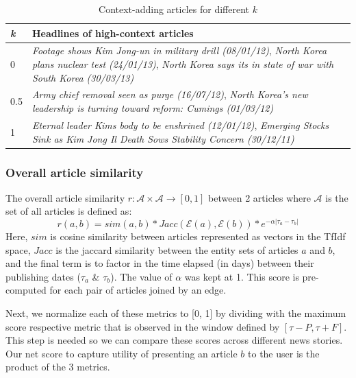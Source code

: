 \begin{table}
\small
\begin{tabular}{|l|p{7cm}|}
\hline
{\bf {\em k}} & {\bf Headlines of high-context articles}\\
\hline
0 & {\em Footage shows Kim Jong-un in military drill (08/01/12)}, {\em North Korea plans nuclear test (24/01/13)}, {\em North Korea says its in state of war with South Korea (30/03/13)}\\
\hline
0.5 & {\em Army chief removal seen as purge (16/07/12)}, {\em North Korea's new leadership is turning toward reform: Cumings (01/03/12)}\\
\hline
1 & {\em Eternal leader Kims body to be enshrined (12/01/12)}, {\em Emerging Stocks Sink as Kim Jong Il Death Sows Stability Concern (30/12/11)}\\
\hline
\end{tabular}
\caption{Context-adding articles for different $k$}
\label{tab:different-contexts}
\end{table}


\subsubsection*{Overall article similarity}
\label{subsec:article_similarity}
The overall article similarity $r:\mathcal{A} \times \mathcal{A} \rightarrow [0,1]$ between 2 articles where $\mathcal{A}$ is the set of all articles is defined as:
\begin{equation}
r(a, b) = sim(a,b) * Jacc(\mathcal{E}(a), \mathcal{E}(b)) * e^{-\alpha|\tau_a - \tau_b|}
\end{equation}
Here, $sim$ is cosine similarity between articles represented as vectors in the TfIdf space, $Jacc$ is the jaccard similarity between
the entity sets of articles $a$ and $b$, and the final term is to factor in the time elapsed (in days) between their publishing dates ($\tau_a$ \& $\tau_b$).
The value of $\alpha$ was kept at 1. This score is pre-computed for each pair of articles joined by an edge. 

Next, we normalize each of these metrics to [0, 1] by dividing with the maximum score respective metric that is observed in the window defined by $[\tau - P, \tau + F]$. This
step is needed so we can compare these scores across different news stories. Our net score to capture utility of presenting an article $b$ to the user is the product of the 3 metrics.
